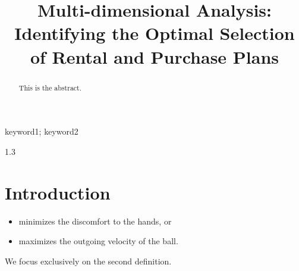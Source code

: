 \documentclass{mcmthesis}
\title{\textbf{Multi-dimensional Analysis: Identifying the Optimal Selection of Rental and Purchase Plans}}
\begin{document}
\begin{abstract}
This is the abstract.

\end{abstract}
\begin{keywords}
keyword1; keyword2
\end{keywords}


\maketitle



\newpage
{} %
\renewcommand{\contentsname}{\hfill Contents \hfill}
\setcounter{tocdepth}{3} %
\begin{spacing}{1.3}
    \tableofcontents
\end{spacing}
\setcounter{page}{2} %
\newpage

\section{Introduction}
\lipsum[2]
\begin{itemize}
\item minimizes the discomfort to the hands, or
\item maximizes the outgoing velocity of the ball.
\end{itemize}
We focus exclusively on the second definition.
\end{document}
